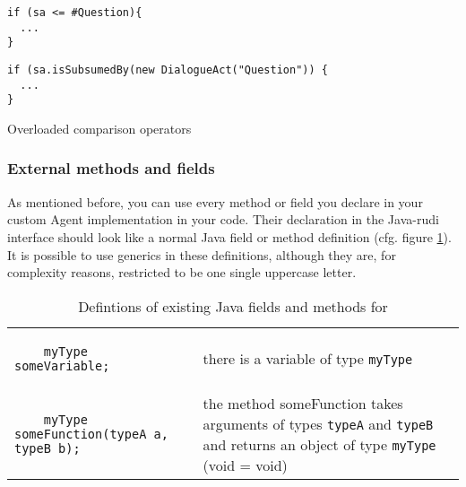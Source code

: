 \begin{table}[htbp]
  \centering
  \begin{footnotesize}
    \begin{minipage}{0.28\textwidth}
\begin{lstlisting}
if (sa <= #Question){
  ...
}
\end{lstlisting}
    \end{minipage}\vline\hspace{1em}
    \begin{minipage}{0.5\textwidth}
\begin{lstlisting}
if (sa.isSubsumedBy(new DialogueAct("Question")) {
  ...
}
\end{lstlisting}
    \end{minipage}
  \end{footnotesize}

  \caption{Overloaded comparison operators}
  \label{tab:overloaded-comparison}
\end{table}

\subsubsection{External methods and fields}
\label{sec:javatypes}

As mentioned before, you can use every method or field you declare in your custom Agent implementation in your \vonda code. Their declaration in the Java-rudi interface should look like a normal Java field or method definition (cfg. figure \ref{tab:javadef}). It is possible to use generics in these definitions, although they are, for complexity reasons, restricted to be one single uppercase letter.

\begin{table}[htbp]
  \small
  \begin{tabular}{lp{}}
    \begin{lstlisting}
    myType someVariable;
    \end{lstlisting}
    &  there is a variable of type \texttt{myType} \\

    \begin{lstlisting}
    myType someFunction(typeA a, typeB b);
    \end{lstlisting}
    &  the method someFunction takes arguments of types \texttt{typeA} and
      \texttt{typeB} and returns an object of type \texttt{myType} (void =
      void)
  \end{tabular}

  \caption{Defintions of existing Java fields and methods for \vonda}
  \label{tab:javadef}
\end{table}


